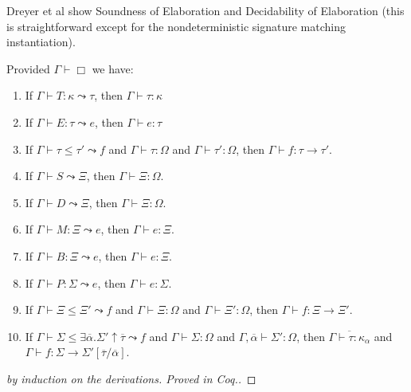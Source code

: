 Dreyer et al show Soundness of Elaboration and Decidability of Elaboration (this is straightforward except for the nondeterministic signature matching instantiation). 
\begin{theorem}
Provided $\Gamma\vdash \Box$ we have:
\begin{enumerate}
\item If $\Gamma\vdash T: \kappa \leadsto \tau$, then $\Gamma\vdash \tau:\kappa$
\item If $\Gamma\vdash E:\tau\leadsto e$, then $\Gamma\vdash e:\tau$
\item If $\Gamma\vdash \tau \le \tau' \leadsto f$ and $\Gamma\vdash \tau:\Omega$ and $\Gamma\vdash \tau':\Omega$, then $\Gamma\vdash f:\tau \to \tau'$. 
\item If $\Gamma\vdash S\leadsto \Xi$, then $\Gamma\vdash \Xi:\Omega$. 
\item If $\Gamma\vdash D\leadsto \Xi$, then $\Gamma\vdash \Xi:\Omega$.
\item If $\Gamma\vdash M:\Xi\leadsto e$, then $\Gamma\vdash e:\Xi$. 
\item If $\Gamma\vdash B:\Xi\leadsto e$, then $\Gamma\vdash e:\Xi$.
\item If $\Gamma\vdash P:\Sigma\leadsto e$, then $\Gamma\vdash e:\Sigma$.
\item If $\Gamma\vdash \Xi \le \Xi'\leadsto f$ and $\Gamma\vdash \Xi:\Omega$ and $\Gamma\vdash \Xi':\Omega$, then $\Gamma\vdash f : \Xi\to \Xi'$. 
\item If $\Gamma\vdash \Sigma \le \exists \overline{\alpha}.\Sigma' \uparrow \overline{\tau} \leadsto f$ and $\Gamma\vdash \Sigma:\Omega$ and $\Gamma,\overline{\alpha}\vdash\Sigma':\Omega$, then $\overline{\Gamma\vdash \tau:\kappa_\alpha}$ and $\Gamma\vdash f:\Sigma\to\Sigma'[\overline{\tau}/\overline{\alpha}]$. 
\end{enumerate}
\end{theorem}
\begin{proof}[by induction on the derivations. Proved in Coq.]
\end{proof}



